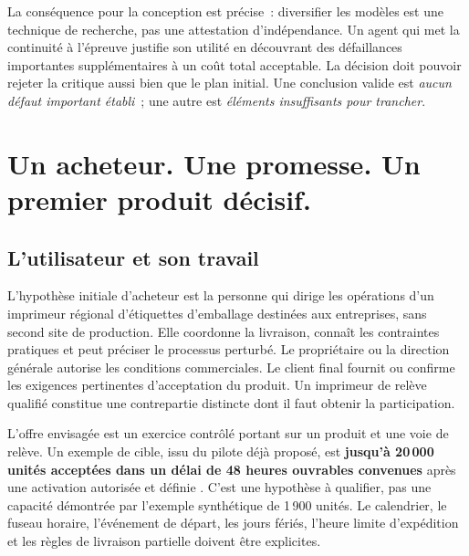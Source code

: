 \documentclass[11pt,a4paper]{article}
\newcommand{\chapterpage}{\clearpage}
\begin{document}
La conséquence pour la conception est précise~: diversifier les modèles est une technique de recherche, pas une attestation d’indépendance. Un agent qui met la continuité à l’épreuve justifie son utilité en découvrant des défaillances importantes supplémentaires à un coût total acceptable. La décision doit pouvoir rejeter la critique aussi bien que le plan initial. Une conclusion valide est \emph{aucun défaut important établi}~; une autre est \emph{éléments insuffisants pour trancher}.

\chapterpage
\section{Un acheteur. Une promesse. Un premier produit décisif.}\label{sec:v1}
\subsection{L’utilisateur et son travail}
L’hypothèse initiale d’acheteur est la personne qui dirige les opérations d’un imprimeur régional d’étiquettes d’emballage destinées aux entreprises, sans second site de production. Elle coordonne la livraison, connaît les contraintes pratiques et peut préciser le processus perturbé. Le propriétaire ou la direction générale autorise les conditions commerciales. Le client final fournit ou confirme les exigences pertinentes d’acceptation du produit. Un imprimeur de relève qualifié constitue une contrepartie distincte dont il faut obtenir la participation.

L’offre envisagée est un exercice contrôlé portant sur un produit et une voie de relève. Un exemple de cible, issu du pilote déjà proposé, est \textbf{jusqu’à 20\,000 unités acceptées dans un délai de 48 heures ouvrables convenues} après une activation autorisée et définie \cite{handoffPilot}. C’est une hypothèse à qualifier, pas une capacité démontrée par l’exemple synthétique de 1\,900 unités. Le calendrier, le fuseau horaire, l’événement de départ, les jours fériés, l’heure limite d’expédition et les règles de livraison partielle doivent être explicites.
\end{document}
